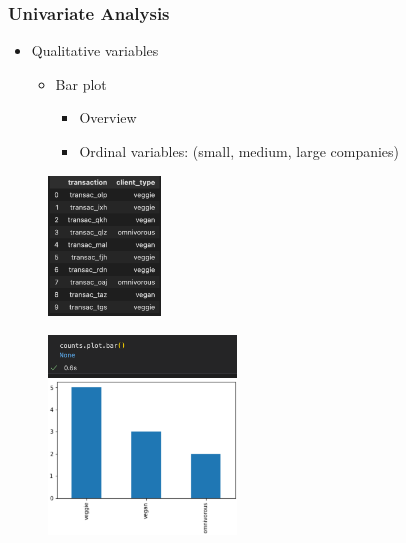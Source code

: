 \begin{frame}\frametitle{Univariate Analysis}
   \begin{minipage}{0.48\linewidth}
      \begin{itemize}
         \item Qualitative variables
         \begin{itemize}
            \item Bar plot
            \begin{itemize}
               \item Overview
               \item Ordinal variables: (small, medium, large companies)
            \end{itemize}
         \end{itemize}
      \end{itemize}
      \vspace{.5cm}
      \begin{figure}[H]
         \includegraphics[width=3cm]{../images/illustrations/pattern_univariate_qualitative_df.png}
      \end{figure}
   \end{minipage}
   \begin{minipage}{0.48\linewidth}
      \begin{figure}[H]
         \includegraphics[width=5cm]{../images/illustrations/pattern_univariate_qualitative_bars.png}
      \end{figure}
   \end{minipage}
\end{frame}


